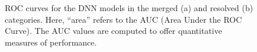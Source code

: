 \begin{figure}[ht]
      \centering
       \caption{ROC curves for the DNN models in the merged (a) and resolved (b) categories. Here, ``area'' refers to the AUC (Area Under the ROC Curve). The AUC values are computed to offer quantitative measures of performance.}
       \label{fig:ROCChecks}
\end{figure}


